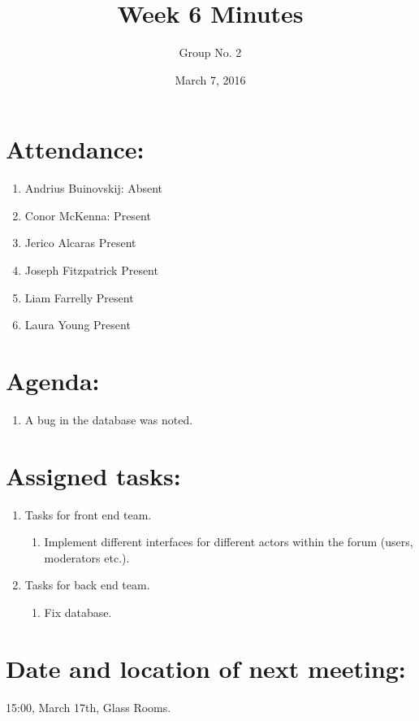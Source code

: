 \documentclass[a4paper, 12pt]{article}
\begin{document}
\title{Week 6 Minutes}
\author{Group No. 2}
\date{March 7, 2016}
\maketitle

	\section{Attendance:}
		\begin{enumerate}[label*=\arabic*.]
			\item Andrius Buinovskij:	\dotfill Absent
			\item Conor McKenna:		\dotfill Present
			\item Jerico Alcaras		\dotfill Present
			\item Joseph Fitzpatrick	\dotfill Present
			\item Liam Farrelly		\dotfill Present
			\item Laura Young		\dotfill Present
		\end{enumerate}

	\section{Agenda:}
		\begin{enumerate}[label*=\arabic*.]
			\item A bug in the database was noted.
		\end{enumerate}

	\newpage
	\section{Assigned tasks:}
		\begin{enumerate}[label*=\arabic*.]
			\item Tasks for front end team.
			\begin{enumerate}[label*=\arabic*.]
				\item Implement different interfaces for different actors within the forum (users, moderators etc.).
			\end{enumerate}
			\item Tasks for back end team.
			\begin{enumerate}[label*=\arabic*.]
				\item Fix database.
			\end{enumerate}
		\end{enumerate}

	\section{Date and location of next meeting:}
		15:00, March 17th, Glass Rooms.
\end{document}

